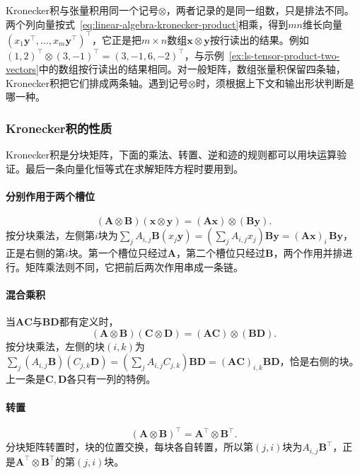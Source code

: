 Kronecker积与张量积用同一个记号$\otimes$，两者记录的是同一组数，只是排法不同。两个列向量按式~\eqref{eq:linear-algebra-kronecker-product}相乘，得到$mn$维长向量$(x_1\bm y^\top,\ldots,x_m\bm y^\top)^\top$，它正是把$m\times n$数组$\bm x\otimes\bm y$按行读出的结果。例如$(1,2)^\top\otimes(3,-1)^\top=(3,-1,6,-2)^\top$，与示例~\ref{ex:ls-tensor-product-two-vectors}中的数组按行读出的结果相同。对一般矩阵，数组张量积保留四条轴，Kronecker积把它们排成两条轴。遇到记号$\otimes$时，须根据上下文和输出形状判断是哪一种。

\subsubsection{Kronecker积的性质}
\label{sec:ls-kronecker-products}

Kronecker积是分块矩阵，下面的乘法、转置、逆和迹的规则都可以用块运算验证。最后一条向量化恒等式在求解矩阵方程时要用到。

\paragraph{分别作用于两个槽位}
\[
 (\bm A\otimes\bm B)(\bm x\otimes\bm y)=(\bm A\bm x)\otimes(\bm B\bm y).
\]
按分块乘法，左侧第$i$块为$\sum_jA_{i,j}\bm B(x_j\bm y)=(\sum_jA_{i,j}x_j)\bm B\bm y=(\bm A\bm x)_i\,\bm B\bm y$，正是右侧的第$i$块。第一个槽位只经过$\bm A$，第二个槽位只经过$\bm B$，两个作用并排进行。矩阵乘法则不同，它把前后两次作用串成一条链。

\paragraph{混合乘积}
当$\bm A\bm C$与$\bm B\bm D$都有定义时，
\begin{equation}
 (\bm A\otimes\bm B)(\bm C\otimes\bm D)
 =(\bm A\bm C)\otimes(\bm B\bm D).
 \label{eq:matrix-analysis-kronecker-mixed-product}
\end{equation}
按分块乘法，左侧的块$(i,k)$为$\sum_j(A_{i,j}\bm B)(C_{j,k}\bm D)=(\sum_jA_{i,j}C_{j,k})\bm B\bm D=(\bm A\bm C)_{i,k}\bm B\bm D$，恰是右侧的块。上一条是$\bm C,\bm D$各只有一列的特例。

\paragraph{转置}
\[
 (\bm A\otimes\bm B)^\top=\bm A^\top\otimes\bm B^\top.
\]
分块矩阵转置时，块的位置交换，每块各自转置，所以第$(j,i)$块为$A_{i,j}\bm B^\top$，正是$\bm A^\top\otimes\bm B^\top$的第$(j,i)$块。

